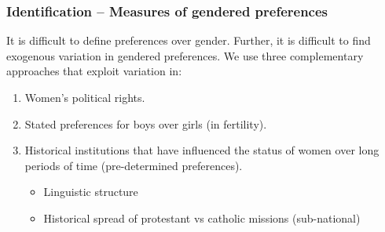 \documentclass[9pt,letterpaper,subeqn]{beamer}
\begin{document}


\begin{frame}
  \frametitle{Identification -- Measures of gendered preferences}
  It is difficult to define preferences over gender.  Further, it is difficult to find exogenous variation in gendered preferences. We use three complementary approaches that exploit variation in: \vspace{3mm}
  \begin{spacing}{1.3}
  \begin{enumerate}
  \item   Women's political rights. 
  \item   Stated preferences for boys over girls (in fertility).
  \item   Historical institutions that have influenced the status of women over long periods of time (pre-determined preferences).
    \begin{itemize}
    \item Linguistic structure 
    \item Historical spread of protestant vs catholic missions (sub-national)
    \end{itemize}
  \end{enumerate}
  \end{spacing}
\end{frame}


\end{document}
